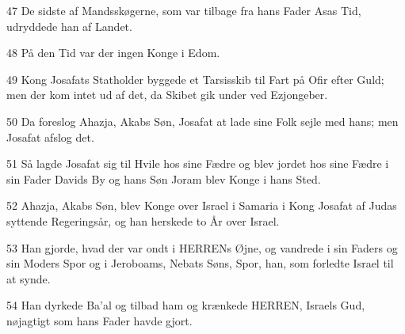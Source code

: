 \par 47 De sidste af Mandsskøgerne, som var tilbage fra hans Fader Asas Tid, udryddede han af Landet.
\par 48 På den Tid var der ingen Konge i Edom.
\par 49 Kong Josafats Statholder byggede et Tarsisskib til Fart på Ofir efter Guld; men der kom intet ud af det, da Skibet gik under ved Ezjongeber.
\par 50 Da foreslog Ahazja, Akabs Søn, Josafat at lade sine Folk sejle med hans; men Josafat afslog det.
\par 51 Så lagde Josafat sig til Hvile hos sine Fædre og blev jordet hos sine Fædre i sin Fader Davids By og hans Søn Joram blev Konge i hans Sted.
\par 52 Ahazja, Akabs Søn, blev Konge over Israel i Samaria i Kong Josafat af Judas syttende Regeringsår, og han herskede to År over Israel.
\par 53 Han gjorde, hvad der var ondt i HERRENs Øjne, og vandrede i sin Faders og sin Moders Spor og i Jeroboams, Nebats Søns, Spor, han, som forledte Israel til at synde.
\par 54 Han dyrkede Ba'al og tilbad ham og krænkede HERREN, Israels Gud, nøjagtigt som hans Fader havde gjort.


